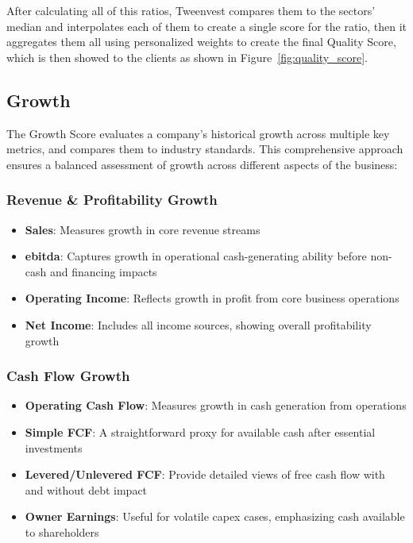 \documentclass[11pt,english,a4paper,hidelinks]{book}
\begin{document}
\noindent After calculating all of this ratios, Tweenvest compares them to the sectors' median and interpolates each of them to create a single score for the ratio, then it aggregates them all using personalized weights to create the final Quality Score, which is then showed to the clients as shown in Figure~\ref{fig:quality_score}.


\subsection{Growth}
\noindent The Growth Score evaluates a company's historical growth across multiple key metrics, and compares them to industry standards. This comprehensive approach ensures a balanced assessment of growth across different aspects of the business:

\subsubsection{Revenue \& Profitability Growth}
\begin{itemize}
    \item \textbf{Sales}: Measures growth in core revenue streams
    \item \textbf{\acrshort{ebitda}}: Captures growth in operational cash-generating ability before non-cash and financing impacts
    \item \textbf{Operating Income}: Reflects growth in profit from core business operations
    \item \textbf{Net Income}: Includes all income sources, showing overall profitability growth
\end{itemize}

\subsubsection{Cash Flow Growth}
\begin{itemize}
    \item \textbf{Operating Cash Flow}: Measures growth in cash generation from operations
    \item \textbf{Simple FCF}: A straightforward proxy for available cash after essential investments
    \item \textbf{Levered/Unlevered FCF}: Provide detailed views of free cash flow with and without debt impact
    \item \textbf{Owner Earnings}: Useful for volatile capex cases, emphasizing cash available to shareholders
\end{itemize}
\end{document}
